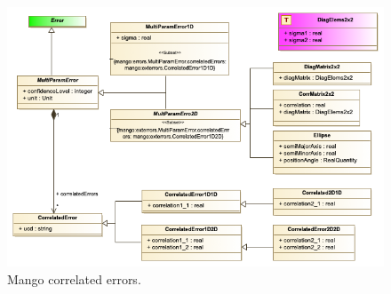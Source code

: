 \documentclass[11pt,a4paper]{ivoa}
\begin{document}
\begin{itemize}
\begin{figure}
  \includegraphics[width=1.0\textwidth]{../model/mangoErrors.png}
  \caption{Mango correlated errors.}
  \label{fig:errors}
\end{figure}




\end{itemize}
\end{document}
